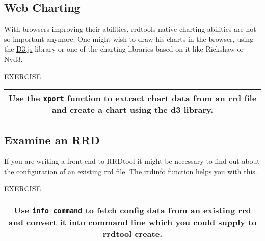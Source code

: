 \documentclass[a4paper,12pt]{article}
\newenvironment{work}{\textsf{\tiny EXERCISE}\nopagebreak\\[0.3ex]\begin{tabular}{|c|}
 \hline
 \begin{minipage}{0.965\linewidth}%
 \setlength{\parskip}{1.6ex plus 0.6ex minus 0.4ex}%
 \rule{0pt}{2.8ex}\ignorespaces}
{\rule[-1.8ex]{0pt}{0pt}\end{minipage}\\
 \hline
 \end{tabular}}
\newcommand{\ex}[1]{\subsection{#1}}
\newcommand{\cmd}[1]{\texttt{\mbox{#1}}}
\begin{document}
\ex{Web Charting}

With browsers improving their abilities, rrdtools native charting abilities
are not so important anymore. One might wish to draw his charts in the
browser, using the \href{http://d3js.org/}{D3.js} library or one of the charting libraries based on it like Rickshaw or Nvd3.

\begin{work}
Use the \cmd{xport} function to extract chart data from an rrd file and create a chart using the d3 library.
\end{work} 

\ex{Examine an RRD}

If you are writing a front end to RRDtool it might be necessary to
find out about the configuration of an existing rrd file. The rrdinfo
function helps you with this.

\begin{work}
  Use \texttt{info command} to fetch config data from an existing rrd
  and convert it into command line which you could supply to rrdtool
  create.
\end{work}
\end{document}
